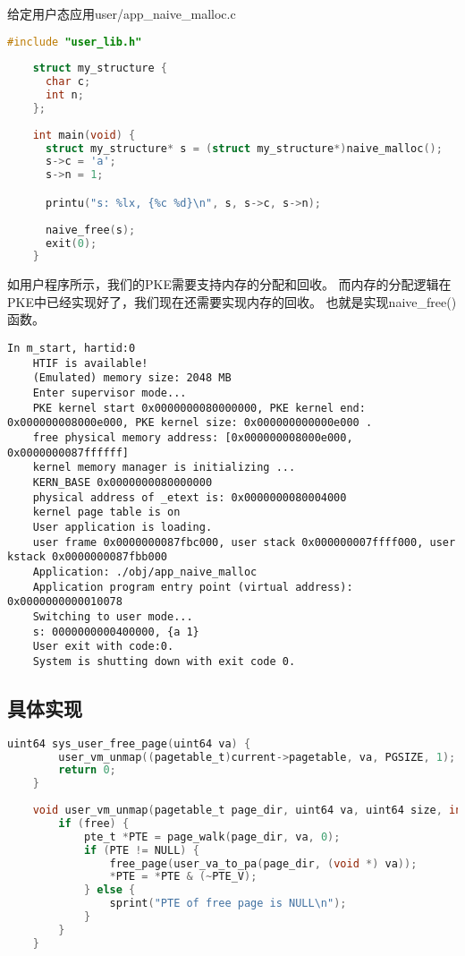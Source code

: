 给定用户态应用user/app\_naive\_malloc.c

\begin{lstlisting}[caption={用户态应用app\_naive\_malloc.c}, label={lst:app_naive_malloc}, language=C]
    #include "user_lib.h"
    
    struct my_structure {
      char c;
      int n;
    };
    
    int main(void) {
      struct my_structure* s = (struct my_structure*)naive_malloc();
      s->c = 'a';
      s->n = 1;

      printu("s: %lx, {%c %d}\n", s, s->c, s->n);
    
      naive_free(s);
      exit(0);
    }   
\end{lstlisting}

如用户程序所示，我们的PKE需要支持内存的分配和回收。
而内存的分配逻辑在PKE中已经实现好了，我们现在还需要实现内存的回收。
也就是实现naive\_free()函数。

\begin{lstlisting}[caption={lab5实验结果（移植K210前）}]
    In m_start, hartid:0
    HTIF is available!
    (Emulated) memory size: 2048 MB
    Enter supervisor mode...
    PKE kernel start 0x0000000080000000, PKE kernel end: 0x000000008000e000, PKE kernel size: 0x000000000000e000 .
    free physical memory address: [0x000000008000e000, 0x0000000087ffffff]
    kernel memory manager is initializing ...
    KERN_BASE 0x0000000080000000
    physical address of _etext is: 0x0000000080004000
    kernel page table is on
    User application is loading.
    user frame 0x0000000087fbc000, user stack 0x000000007ffff000, user kstack 0x0000000087fbb000
    Application: ./obj/app_naive_malloc
    Application program entry point (virtual address): 0x0000000000010078
    Switching to user mode...
    s: 0000000000400000, {a 1}
    User exit with code:0.
    System is shutting down with exit code 0.    
\end{lstlisting}

\subsection{具体实现}

\begin{lstlisting}[caption={内存回收实现}, label={lst:naive_free}, language=C]
    uint64 sys_user_free_page(uint64 va) {
        user_vm_unmap((pagetable_t)current->pagetable, va, PGSIZE, 1);
        return 0;
    }  
    
    void user_vm_unmap(pagetable_t page_dir, uint64 va, uint64 size, int free) {
        if (free) {
            pte_t *PTE = page_walk(page_dir, va, 0);
            if (PTE != NULL) {
                free_page(user_va_to_pa(page_dir, (void *) va));
                *PTE = *PTE & (~PTE_V);
            } else {
                sprint("PTE of free page is NULL\n");
            }
        }
    }    
\end{lstlisting}

